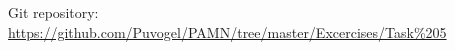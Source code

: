 \appendix
 \chapter{}
 Git repository: \href{https://github.com/Puvogel/PAMN/tree/master/Excercises/Task%205}{https://github.com/Puvogel/PAMN/tree/master/Excercises/Task\%205}


